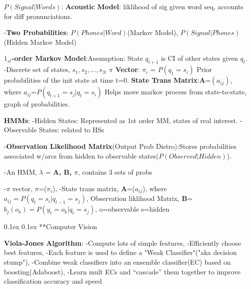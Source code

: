 \documentclass[10pt,landscape]{article}
\makeatletter
\renewcommand{\section}{\@startsection{section}{1}{0mm}%
                                {0.1ex}%
                                {0.1ex}%
                                {\normalfont\normalsize\bfseries}}
\makeatother
\begin{document}
\begin{multicols}{3}
$P(Signal|Words)$: \textbf{Acoustic Model}: liklihood of sig given word seq, accounts for diff pronunciations.

-\textbf{Two Probabilities}: $P(Phones|Word)$(Markov Model), $P(Signal|Phones)$(Hidden Markov Model)

\textbf{$1_{st}$-order Markov Model}:Assumption: State $q_{t+1}$ is CI of other states given $q_t$. -Discrete set of states, $s_1,s_2,...,s_N$ \textbf{$\pi$ Vector}: \textbf{$\pi_i$} = $P(q_1=s_i)$ Prior probabilities of the init state at time t=0. \textbf{State Trans Matrix}:\textbf{A}=$(a_{ij})$, where $a_{ij}$=$P(q_{t+1}=s_j|q_t=s_i)$ Helps move markov process from state-to-state, graph of probabilities.

\textbf{HMMs}: -Hidden States: Represented as 1st order MM, states of real interest. -Observable States: related to HSs

-\textbf{Observation Likelihood Matrix}(Output Prob Distro):Stores probabilities associated w/arcs from hidden to observable states($P(Observed|Hidden)$).

-An HMM, $\lambda$ = \textbf{A, B, $\pi$}, contains 3 sets of probs

-\textbf{$\pi$} vector, \textbf{$\pi$}=($\pi_i$), -State trans matrix, \textbf{A}=($a_{ij}$), where $a_{ij}=P(q_t=s_i|q_{t-1}=s_j)$, Observation liklihood Matrix, \textbf{B}=$b_j(o_k)=P(y_t=o_k|q_t=s_j)$, o=observable s=hidden




\section{**Computer Vision}

\textbf{Viola-Jones Algorithm}: -Compute lots of simple features, -Efficiently choose best features, -Each feature is used to define a "Weak Classifier"("aka decision stump"), -Combine weak classifiers into an ensemble classifier(EC) based on boosting(Adaboost), -Learn mult ECs and ``cascade'' them together to improve classification accuracy and speed


\end{multicols}
\end{document}
